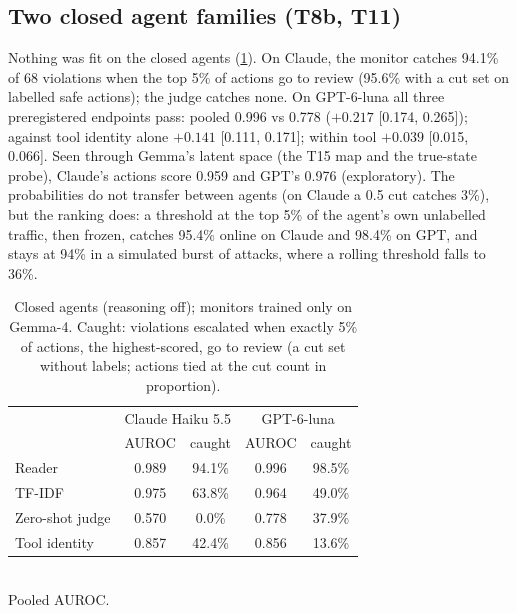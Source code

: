 \documentclass{article}
\begin{document}
\subsection{Two closed agent families (T8b, T11)}
\label{sec:closed}
Nothing was fit on the closed agents (\cref{tab:closed}).
On Claude, the monitor catches 94.1\% of 68 violations when the top 5\% of actions go to review (95.6\% with a cut set on labelled safe actions); the judge catches none.
On GPT-6-luna all three preregistered endpoints pass: pooled 0.996 vs 0.778 ($+0.217$ [0.174, 0.265]); against tool identity alone $+0.141$ [0.111, 0.171]; within tool $+0.039$ [0.015, 0.066].
Seen through Gemma's latent space (the T15 map and the true-state probe), Claude's actions score 0.959 and GPT's 0.976 (exploratory).
The probabilities do not transfer between agents (on Claude a 0.5 cut catches 3\%), but the ranking does: a threshold at the top 5\% of the agent's own unlabelled traffic, then frozen, catches 95.4\% online on Claude and 98.4\% on GPT, and stays at 94\% in a simulated burst of attacks, where a rolling threshold falls to 36\%.

\begin{table}[t]
\centering\small
\caption{Closed agents (reasoning off); monitors trained only on Gemma-4. Caught: violations escalated when exactly 5\% of actions, the highest-scored, go to review (a cut set without labels; actions tied at the cut count in proportion).}
\label{tab:closed}
\begin{tabular}{lcccc}
\toprule
 & \multicolumn{2}{c}{Claude Haiku 5.5} & \multicolumn{2}{c}{GPT-6-luna}\\
 & AUROC & caught & AUROC & caught\\
\midrule
Reader & 0.989 & 94.1\% & 0.996 & 98.5\%\\
TF-IDF & 0.975 & 63.8\% & 0.964 & 49.0\%\\
Zero-shot judge & 0.570 & 0.0\% & 0.778 & 37.9\%\\
Tool identity & 0.857 & 42.4\% & 0.856 & 13.6\%\\
\bottomrule
\end{tabular}\\[2pt]
\footnotesize Pooled AUROC.
\end{table}
\end{document}
